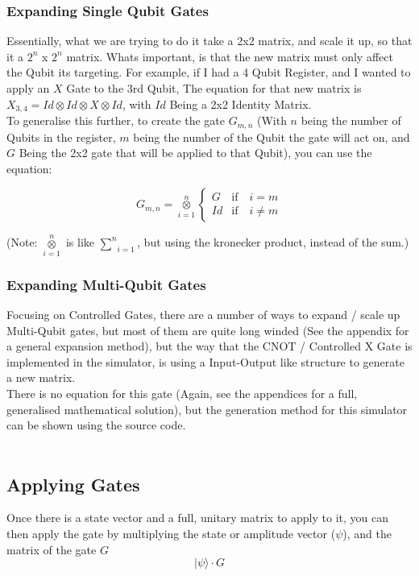 \documentclass[../main.tex]{subfiles}
\begin{document}
\subsubsection{Expanding Single Qubit Gates}
Essentially, what we are trying to do it take a 2x2 matrix, and scale it up, so that it a \(2^n\) x \(2^n\) matrix. Whats important, is that the new matrix must only affect the Qubit its targeting. For example, if I had a 4 Qubit Register, and I wanted to apply an \(X\) Gate to the 3rd Qubit, The equation for that new matrix is \(X_{3,4} = Id \otimes Id \otimes X \otimes Id \), with \(Id\) Being a 2x2 Identity Matrix. \\
To generalise this further, to create the gate \(G_{m,n}\) (With \(n\) being the number of Qubits in the register, \(m\) being the number of the Qubit the gate will act on, and \(G\) Being the 2x2 gate that will be applied to that Qubit), 
you can use the equation:

\begin{equation} \label{eq:single-gate-gen}
	G_{m,n} = \underset{i=1}{\overset{n}{\otimes}}
	\begin{cases}
    	G & \text{if} \quad i = m \\
    	Id & \text{if} \quad i \neq m
	\end{cases}
\end{equation}

(Note: \(\underset{i=1}{\overset{n}{\otimes}}\) is like \(\underset{i=1}{\overset{n}{\sum}}\), but using the kronecker product, instead of the sum.)

\subsubsection{Expanding Multi-Qubit Gates}
Focusing on Controlled Gates, there are a number of ways to expand / scale up Multi-Qubit gates, but most of them are quite long winded (See the appendix for a general expansion method),
but the way that the CNOT / Controlled X Gate is implemented in the simulator, is using a Input-Output like structure to generate a new matrix. \\
There is no equation for this gate (Again, see the appendices for a full, generalised mathematical solution), but the generation method for this simulator can be shown using the source code. \\ \\ 

\subsection{Applying Gates}
Once there is a state vector and a full, unitary matrix to apply to it,
you can then apply the gate by multiplying the state or amplitude vector (\(\psi\)), and the matrix of the gate \(G\) \\
\begin{equation}
	\lvert\psi\rangle \cdot G
\end{equation}
\end{document}
